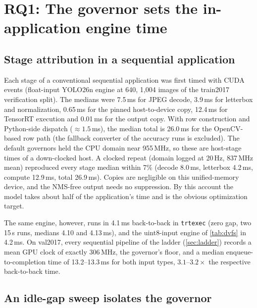 \section{RQ1: The governor sets the in-application engine time}
\label{sec:diagnosis}

\subsection{Stage attribution in a sequential application}

Each stage of a conventional sequential application was first timed
with CUDA events (float-input YOLO26n engine at 640, 1,004 images of
the train2017 verification split). The medians were 7.5\,ms
for JPEG decode, 3.9\,ms for letterbox and normalization, 0.65\,ms for
the pinned host-to-device copy, 12.4\,ms for TensorRT execution and
0.01\,ms for the output copy. With row construction and Python-side
dispatch (${\approx}1.5$\,ms), the median total is 26.0\,ms for the
OpenCV-based row path (the fallback converter of the accuracy runs is
excluded). The default governors held the CPU domain near 955\,MHz, so
these are host-stage times of a down-clocked host. A clocked repeat (domain logged at 20\,Hz, 837\,MHz
mean) reproduced every stage median within 7\% (decode 8.0\,ms,
letterbox 4.2\,ms, compute 12.9\,ms, total 26.9\,ms). Copies are
negligible on this unified-memory device, and the NMS-free output needs
no suppression. By this account the model takes about half of the
application's time and is the obvious optimization target.

The same engine, however, runs in 4.1\,ms back-to-back in
\texttt{trtexec} (zero gap, two 15\,s runs, medians 4.10 and
4.13\,ms), and the uint8-input engine of \cref{tab:dvfs} in 4.2\,ms.
On val2017, every sequential pipeline of the ladder (\cref{sec:ladder})
records a mean GPU clock of exactly 306\,MHz, the governor's floor, and
a median enqueue-to-completion time of 13.2--13.3\,ms for both input
types, $3.1$--$3.2\times$ the respective back-to-back time.

\subsection{An idle-gap sweep isolates the governor}

